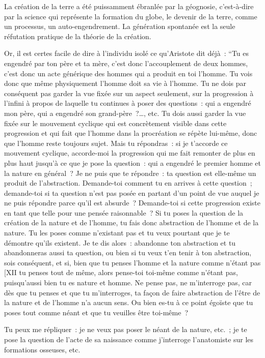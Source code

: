 \documentclass[french,twoside]{book} %
\begin{document}
La création de la terre a été puissamment ébranlée par la géognosie, c’est-à-dire par la science qui représente la formation du globe, le devenir de la terre, comme un processus, un auto-engendrement. La génération spontanée est la seule réfutation pratique de la théorie de la création.\par
Or, il est certes facile de dire à l’individu isolé ce qu’Aristote dit déjà : “Tu es engendré par ton père et ta mère, c’est donc l’accouplement de deux hommes, c’est donc un acte générique des hommes qui a produit en toi l’homme. Tu vois donc que même physiquement l’homme doit sa vie à l’homme. Tu ne dois par conséquent pas garder la vue fixée sur un aspect seulement, sur la progression à l’infini à propos de laquelle tu continues à poser des questions : qui a engendré mon père, qui a engendré son grand-père ?…, etc. Tu dois aussi garder la vue fixée sur le mouvement cyclique qui est concrètement visible dans cette progression et qui fait que l’homme dans la procréation se répète lui-même, donc que l’homme reste toujours sujet. Mais tu répondras : si je t’accorde ce mouvement cyclique, accorde-moi la progression qui me fait remonter de plus en plus haut jusqu’à ce que je pose la question : qui a engendré le premier homme et la nature en général ? Je ne puis que te répondre : ta question est elle-même un produit de l’abstraction. Demande-toi comment tu en arrives à cette question ; demande-toi si ta question n’est pas posée en partant d’un point de vue auquel je ne puis répondre parce qu’il est absurde ? Demande-toi si cette progression existe en tant que telle pour une pensée raisonnable ? Si tu poses la question de la création de la nature et de l’homme, tu fais donc abstraction de l’homme et de la nature. Tu les poses comme n’existant pas et tu veux pourtant que je te démontre qu’ils existent. Je te dis alors : abandonne ton abstraction et tu abandonneras aussi ta question, ou bien si tu veux t’en tenir à ton abstraction, sois conséquent, et si, bien que tu penses l’homme et la nature comme n’étant pas [XII tu penses tout de même, alors pense-toi toi-même comme n’étant pas, puisqu’aussi bien tu es nature et homme. Ne pense pas, ne m’interroge pas, car dès que tu penses et que tu m’interroges, ta façon de faire abstraction de l’être de la nature et de l’homme n’a aucun sens. Ou bien es-tu à ce point égoïste que tu poses tout comme néant et que tu veuilles être toi-même ?\par
Tu peux me répliquer : je ne veux pas poser le néant de la nature, etc. ; je te pose la question de l’acte de sa naissance comme j’interroge l’anatomiste sur les formations osseuses, etc.\par
\end{document}

